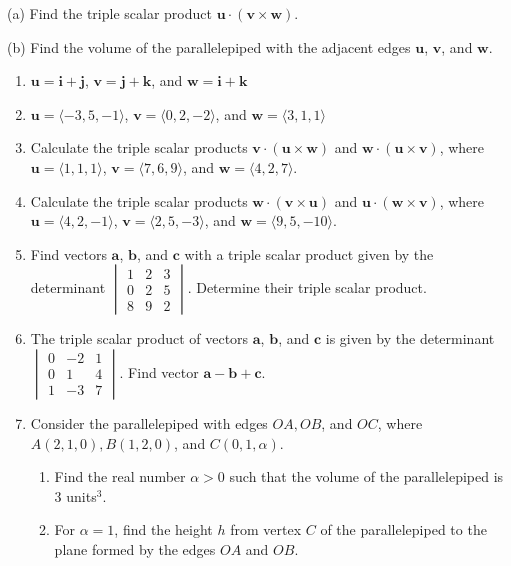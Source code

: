 \documentclass{exercises}
\begin{document}
(a) Find the triple scalar product $\mathbf{u}\cdot(\mathbf{v}\times \mathbf{w})$.


(b) Find the volume of the parallelepiped with the adjacent edges $\mathbf{u}$, $\mathbf{v}$, and $\mathbf{w}$.

\begin{enumerate}[resume]
\item $\mathbf{u}=\mathbf{i}+\mathbf{j}$, $\mathbf{v}=\mathbf{j}+\mathbf{k}$, and $\mathbf{w}=\mathbf{i}+\mathbf{k}$
\item $\mathbf{u}=\langle-3,5,-1\rangle$, $\mathbf{v}=\langle0,2,-2\rangle$, and $\mathbf{w}=\langle3,1,1\rangle$
\item Calculate the triple scalar products $\mathbf{v}\cdot(\mathbf{u}\times \mathbf{w})$ and $\mathbf{w}\cdot(\mathbf{u}\times \mathbf{v})$, where $\mathbf{u}=\langle1,1,1\rangle$, $\mathbf{v}=\langle7,6,9\rangle$, and $\mathbf{w}=\langle4,2,7\rangle$.
\item Calculate the triple scalar products $\mathbf{w}\cdot(\mathbf{v}\times \mathbf{u})$ and $\mathbf{u}\cdot(\mathbf{w}\times \mathbf{v})$, where $\mathbf{u}=\langle4,2,-1\rangle$, $\mathbf{v}=\langle2,5,-3\rangle$, and $\mathbf{w}=\langle9,5,-10\rangle$.
\item Find vectors $\mathbf{a}$, $\mathbf{b}$, and $\mathbf{c}$ with a triple scalar product given by the determinant $\begin{vmatrix}1 & 2 & 3 \\ 0 & 2 & 5 \\ 8 & 9 & 2\end{vmatrix}$. Determine their triple scalar product.
\item The triple scalar product of vectors $\mathbf{a}$, $\mathbf{b}$, and $\mathbf{c}$ is given by the determinant $\begin{vmatrix}0 & -2 & 1 \\ 0 & 1 & 4 \\ 1 & -3 & 7\end{vmatrix}$. Find vector $\mathbf{a}-\mathbf{b}+\mathbf{c}$.
\item Consider the parallelepiped with edges $OA,OB$, and $OC$, where $A(2,1,0),B(1,2,0)$, and $C(0,1,\alpha)$.
\begin{enumerate}[label=(\alph*)]
  \item Find the real number $\alpha>0$ such that the volume of the parallelepiped is $3$ units$^{3}$.
  \item For $\alpha=1$, find the height $h$ from vertex $C$ of the parallelepiped to the plane formed by the edges $OA$ and $OB$.

\end{enumerate}
\end{enumerate}
\end{document}
